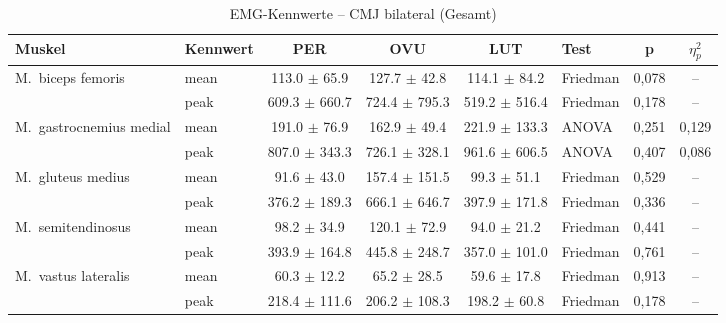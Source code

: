 
\begin{table}[H]
  \centering
  \caption{EMG-Kennwerte – CMJ bilateral (Gesamt)}
  \label{tab:CMJ_bilateral_Gesamt}
  \small
  \begin{tabular}{l l c c c l c c}
    \hline
    \textbf{Muskel} & \textbf{Kennwert} & \textbf{PER} & \textbf{OVU} & \textbf{LUT} & \textbf{Test} & \textbf{p} & \textbf{$\eta^2_p$} \\
    \hline
    M.~biceps femoris & mean & 113.0 $\pm$ 65.9 & 127.7 $\pm$ 42.8 & 114.1 $\pm$ 84.2 & Friedman & 0{,}078 & -- \\
     & peak & 609.3 $\pm$ 660.7 & 724.4 $\pm$ 795.3 & 519.2 $\pm$ 516.4 & Friedman & 0{,}178 & -- \\
    \hline
    M.~gastrocnemius medial & mean & 191.0 $\pm$ 76.9 & 162.9 $\pm$ 49.4 & 221.9 $\pm$ 133.3 & ANOVA & 0{,}251 & 0{,}129 \\
     & peak & 807.0 $\pm$ 343.3 & 726.1 $\pm$ 328.1 & 961.6 $\pm$ 606.5 & ANOVA & 0{,}407 & 0{,}086 \\
    \hline
    M.~gluteus medius & mean & 91.6 $\pm$ 43.0 & 157.4 $\pm$ 151.5 & 99.3 $\pm$ 51.1 & Friedman & 0{,}529 & -- \\
     & peak & 376.2 $\pm$ 189.3 & 666.1 $\pm$ 646.7 & 397.9 $\pm$ 171.8 & Friedman & 0{,}336 & -- \\
    \hline
    M.~semitendinosus & mean & 98.2 $\pm$ 34.9 & 120.1 $\pm$ 72.9 & 94.0 $\pm$ 21.2 & Friedman & 0{,}441 & -- \\
     & peak & 393.9 $\pm$ 164.8 & 445.8 $\pm$ 248.7 & 357.0 $\pm$ 101.0 & Friedman & 0{,}761 & -- \\
    \hline
    M.~vastus lateralis & mean & 60.3 $\pm$ 12.2 & 65.2 $\pm$ 28.5 & 59.6 $\pm$ 17.8 & Friedman & 0{,}913 & -- \\
     & peak & 218.4 $\pm$ 111.6 & 206.2 $\pm$ 108.3 & 198.2 $\pm$ 60.8 & Friedman & 0{,}178 & -- \\
    \hline
  \end{tabular}
\end{table}

